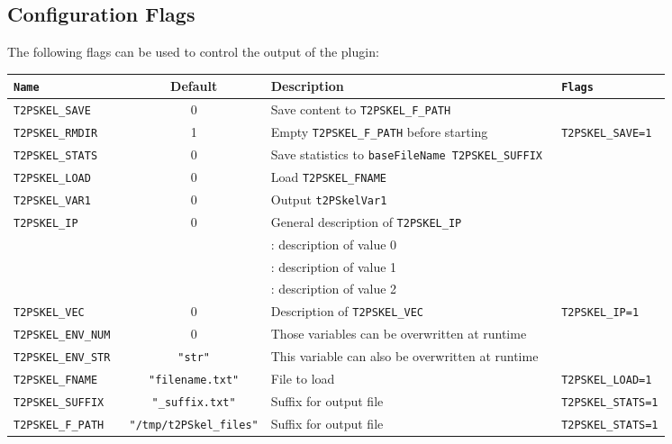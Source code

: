 \documentclass[documentation]{subfiles}
\begin{document}
\subsection{Configuration Flags}
The following flags can be used to control the output of the plugin:
\begin{longtable}{>{\tt}lcl>{\tt\small}l}
    \toprule
    {\bf Name} & {\bf Default} & {\bf Description} & {\bf Flags}\\
    \midrule\endhead%
    T2PSKEL\_SAVE     & 0 & Save content to {\tt T2PSKEL\_F\_PATH}                & \\
    T2PSKEL\_RMDIR    & 1 & Empty {\tt T2PSKEL\_F\_PATH} before starting          & T2PSKEL\_SAVE=1\\ %
    T2PSKEL\_STATS    & 0 & Save statistics to {\tt baseFileName T2PSKEL\_SUFFIX} & \\
    T2PSKEL\_LOAD     & 0 & Load {\tt T2PSKEL\_FNAME}                             & \\
    T2PSKEL\_VAR1     & 0 & Output {\tt t2PSkelVar1}                              & \\
    T2PSKEL\_IP       & 0 & General description of {\tt T2PSKEL\_IP}              & \\
                      &   & \qquad 0: description of value 0                      & \\
                      &   & \qquad 1: description of value 1                      & \\
                      &   & \qquad 2: description of value 2                      & \\
    T2PSKEL\_VEC      & 0 & Description of {\tt T2PSKEL\_VEC}                     & T2PSKEL\_IP=1   \\ %
    T2PSKEL\_ENV\_NUM & 0 & Those variables can be overwritten at runtime         & \\
    T2PSKEL\_ENV\_STR & {\tt\small "str"}
                          & This variable can also be overwritten at runtime      & \\
    T2PSKEL\_FNAME    & {\tt\small "filename.txt"}
                          & File to load                                          & T2PSKEL\_LOAD=1 \\ %
    T2PSKEL\_SUFFIX   & {\tt\small "\_suffix.txt"}
                          & Suffix for output file                                & T2PSKEL\_STATS=1\\ %
    T2PSKEL\_F\_PATH  & {\tt\small "/tmp/t2PSkel\_files"}
                          & Suffix for output file                                & T2PSKEL\_STATS=1\\ %
    \bottomrule
\end{longtable}
\end{document}
